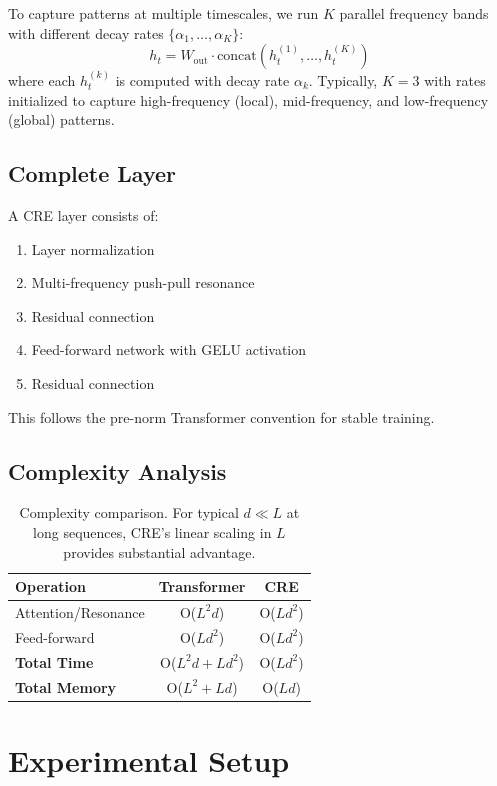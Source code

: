 \documentclass{article}
\begin{document}
To capture patterns at multiple timescales, we run $K$ parallel frequency bands with different decay rates $\{\alpha_1, \ldots, \alpha_K\}$:
\begin{equation}
h_t = W_{\text{out}} \cdot \text{concat}(h_t^{(1)}, \ldots, h_t^{(K)})
\end{equation}
where each $h_t^{(k)}$ is computed with decay rate $\alpha_k$. Typically, $K=3$ with rates initialized to capture high-frequency (local), mid-frequency, and low-frequency (global) patterns.

\subsection{Complete Layer}

A CRE layer consists of:
\begin{enumerate}
\item Layer normalization
\item Multi-frequency push-pull resonance
\item Residual connection
\item Feed-forward network with GELU activation
\item Residual connection
\end{enumerate}

This follows the pre-norm Transformer convention for stable training.

\subsection{Complexity Analysis}

\begin{table}[h]
\centering
\begin{tabular}{lcc}
\toprule
Operation & Transformer & CRE \\
\midrule
Attention/Resonance & O($L^2 d$) & O($L d^2$) \\
Feed-forward & O($L d^2$) & O($L d^2$) \\
\textbf{Total Time} & O($L^2 d + L d^2$) & O($L d^2$) \\
\textbf{Total Memory} & O($L^2 + L d$) & O($L d$) \\
\bottomrule
\end{tabular}
\caption{Complexity comparison. For typical $d \ll L$ at long sequences, CRE's linear scaling in $L$ provides substantial advantage.}
\end{table}

\section{Experimental Setup}
\end{document}
